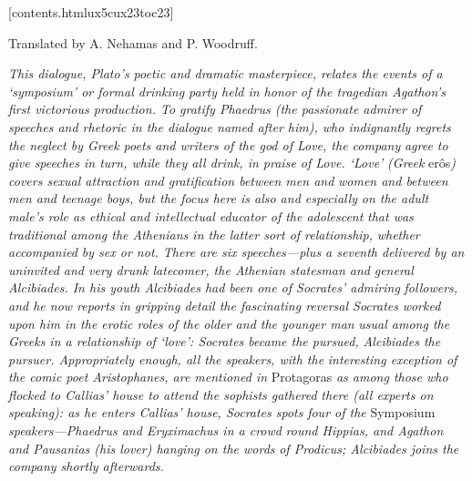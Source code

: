 [contents.htmlux5cux23toc23]

Translated by A. Nehamas and P. Woodruff.

{\em This dialogue, Plato's poetic and dramatic masterpiece, relates the
events of a} {\em ‘symposium' or formal drinking party held in honor of
the tragedian Agathon's} {\em first victorious production. To gratify
Phaedrus (the passionate admirer of} {\em speeches and rhetoric in the
dialogue named after him), who indignantly regrets} {\em the neglect by
Greek poets and writers of the god of Love, the company} {\em agree to
give speeches in turn, while they all drink, in praise of Love. ‘Love'}
{\em (Greek} erôs{\em ) covers sexual attraction and gratification
between men and} {\em women and between men and teenage boys, but the
focus here is also and especially} {\em on the adult male's role as
ethical and intellectual educator of the adolescent} {\em that was
traditional among the Athenians in the latter sort of relationship,}
{\em whether accompanied by sex or not. There are six speeches---plus a
seventh delivered} {\em by an uninvited and very drunk latecomer, the
Athenian statesman and} {\em general Alcibiades. In his youth Alcibiades
had been one of Socrates' admiring} {\em followers, and he now reports
in gripping detail the fascinating reversal Socrates} {\em worked upon
him in the erotic roles of the older and the younger man} {\em usual
among the Greeks in a relationship of ‘love': Socrates became the
pursued,} {\em Alcibiades the pursuer. Appropriately enough, all the
speakers, with the} {\em interesting exception of the comic poet
Aristophanes, are mentioned in} Protagoras {\em as among those who
flocked to Callias' house to attend the sophists gathered} {\em there
(all experts on speaking): as he enters Callias' house, Socrates spots}
{\em four of the} Symposium {\em speakers---Phaedrus and Eryximachus in
a crowd} {\em round Hippias, and Agathon and Pausanias (his lover)
hanging on the words} {\em of Prodicus; Alcibiades joins the company
shortly afterwards.}

